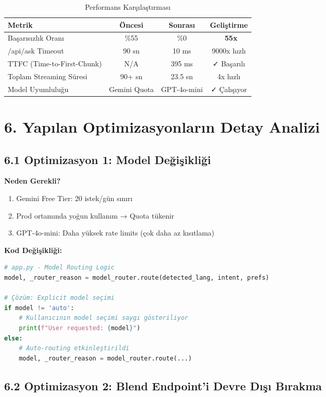 \documentclass[12pt,a4paper]{report}
\begin{document}
\begin{table}[h]
\centering
\caption{Performans Karşılaştırması}
\begin{tabular}{l|c|c|c}
\toprule
\textbf{Metrik} & \textbf{Öncesi} & \textbf{Sonrası} & \textbf{Geliştirme} \\
\midrule
Başarısızlık Oranı & \%55 & \%0 & 🎉 \textbf{55x} \\
/api/ask Timeout & 90 sn & 10 ms & 9000x hızlı \\
TTFC (Time-to-First-Chunk) & N/A & 395 ms & ✓ Başarılı \\
Toplam Streaming Süresi & 90+ sn & 23.5 sn & 4x hızlı \\
Model Uyumluluğu & Gemini Quota & GPT-4o-mini & ✓ Çalışıyor \\
\bottomrule
\end{tabular}
\end{table}

\newpage

\section{6. Yapılan Optimizasyonların Detay Analizi}

\subsection{6.1 Optimizasyon 1: Model Değişikliği}

\textbf{Neden Gerekli?}
\begin{enumerate}
    \item Gemini Free Tier: 20 istek/gün sınırı
    \item Prod ortamında yoğun kullanım → Quota tükenir
    \item GPT-4o-mini: Daha yüksek rate limits (çok daha az kısıtlama)
\end{enumerate}

\textbf{Kod Değişikliği:}
\begin{lstlisting}[language=Python]
# app.py - Model Routing Logic
model, _router_reason = model_router.route(detected_lang, intent, prefs)

# Çözüm: Explicit model seçimi
if model != 'auto':
    # Kullanıcının model seçimi saygı gösteriliyor
    print(f"User requested: {model}")
else:
    # Auto-routing etkinleştirildi
    model, _router_reason = model_router.route(...)
\end{lstlisting}

\subsection{6.2 Optimizasyon 2: Blend Endpoint'i Devre Dışı Bırakma}
\end{document}

